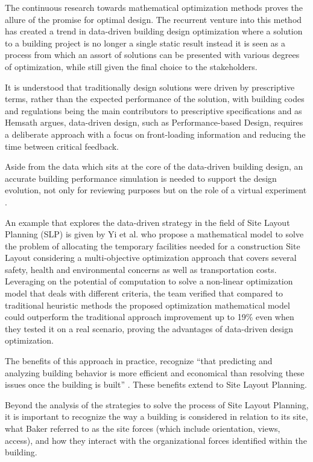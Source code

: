 The continuous research towards mathematical optimization methods proves the allure of the promise for optimal design. The recurrent venture into this method has created a trend in data-driven building design optimization where a solution to a building project is no longer a single static result instead it is seen as a process from which an assort of solutions can be presented with various degrees of optimization, while still given the final choice to the stakeholders.

It is understood that traditionally design solutions were driven by prescriptive terms, rather than the expected performance of the solution, with building codes and regulations being the main contributors to prescriptive specifications \cite{Augenbroe2012} and as Hemsath \cite{Hemsath2012} argues, data-driven design, such as Performance-based Design, requires a deliberate approach with a focus on front-loading information and reducing the time between critical feedback.

Aside from the data which sits at the core of the data-driven building design, an accurate building performance simulation is needed to support the design evolution, not only for reviewing purposes but on the role of a virtual experiment \cite{Augenbroe2012}.

An example that explores the data-driven strategy in the field of Site Layout Planning (SLP) is given by Yi et al. \cite{Yi2018} who propose a mathematical model to solve the problem of allocating the temporary facilities needed for a construction Site Layout considering a multi-objective optimization approach that covers several safety, health and environmental concerns as well as transportation costs. Leveraging on the potential of computation to solve a non-linear optimization model that deals with different criteria, the team verified that compared to traditional heuristic methods the proposed optimization mathematical model could outperform the traditional approach improvement up to 19\% even when they tested it on a real scenario, proving the advantages of data-driven design optimization. 

The benefits of this approach in practice, recognize “that predicting and analyzing building behavior is more efficient and economical than resolving these issues once the building is built” \cite{Hemsath2012}. These benefits extend to Site Layout Planning.

Beyond the analysis of the strategies to solve the process of Site Layout Planning, it is important to recognize the way a building is considered in relation to its site, what Baker \cite{Baker2003} referred to as the site forces (which include orientation, views, access), and how they interact with the organizational forces identified within the building.


